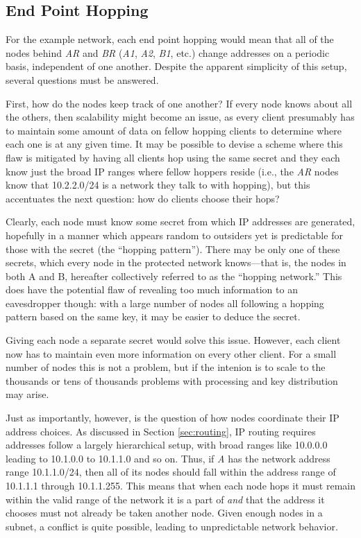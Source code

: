 \subsection{End Point Hopping}
\par For the example network, each end point hopping would mean that all of the nodes behind \textit{AR} and \textit{BR} (\textit{A1}, \textit{A2}, \textit{B1}, etc.) change addresses on a periodic basis, independent of one another. Despite the apparent simplicity of this setup, several questions must be answered.

\par First, how do the nodes keep track of one another? If every node knows about all the others, then scalability might become an issue, as every client presumably has to maintain some amount of data on fellow hopping clients to determine where each one is at any given time. It may be possible to devise a scheme where this flaw is mitigated by having all clients hop using the same secret and they each know just the broad IP ranges where fellow hoppers reside (i.e., the \textit{AR} nodes know that 10.2.2.0/24 is a network they talk to with hopping), but this accentuates the next question: how do clients choose their hops?

\par Clearly, each node must know some secret from which IP addresses are generated, hopefully in a manner which appears random to outsiders yet is predictable for those with the secret (the ``hopping pattern''). There may be only one of these secrets, which every node in the protected network knows---that is, the nodes in both A and B, hereafter collectively referred to as the ``hopping network.'' This does have the potential flaw of revealing too much information to an eavesdropper though: with a large number of nodes all following a hopping pattern based on the same key, it may be easier to deduce the secret.

\par Giving each node a separate secret would solve this issue. However, each client now has to maintain even more information on every other client. For a small number of nodes this is not a problem, but if the intenion is to scale to the thousands or tens of thousands problems with processing and key distribution may arise.  

\par Just as importantly, however, is the question of how nodes coordinate their IP address choices. As discussed in Section \ref{sec:routing}, IP routing requires addresses follow a largely hierarchical setup, with broad ranges like 10.0.0.0 leading to 10.1.0.0 to 10.1.1.0 and so on. Thus, if \textit{A} has the network address range 10.1.1.0/24, then all of its nodes should fall within the address range of 10.1.1.1 through 10.1.1.255. This means that when each node hops it must remain within the valid range of the network it is a part of \textit{and} that the address it chooses must not already be taken another node. Given enough nodes in a subnet, a conflict is quite possible, leading to unpredictable network behavior. 

